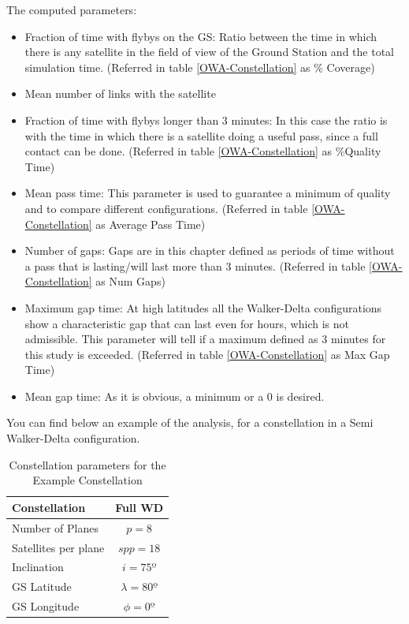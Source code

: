 The computed parameters:\label{PerfAnal}
\begin{itemize}
\item Fraction of time with flybys on the GS: Ratio between the time in which there is any satellite in the field of view of the Ground Station and the total simulation time. (Referred in table \ref{OWA-Constellation} as \% Coverage)
\item Mean number of links with the satellite
\item Fraction of time with flybys longer than 3 minutes: In this case the ratio is with the time in which there is a satellite doing a useful pass, since a full contact can be done. (Referred in table \ref{OWA-Constellation} as \%Quality Time) 
\item Mean pass time: This parameter is used to guarantee a minimum of quality and to compare different configurations. (Referred in table \ref{OWA-Constellation} as Average Pass Time)
\item Number of gaps: Gaps are in this chapter defined as periods of time without a pass that is lasting/will last more than 3 minutes. (Referred in table \ref{OWA-Constellation} as Num Gaps)
\item Maximum gap time: At high latitudes all the Walker-Delta configurations show a characteristic gap that can last even for hours, which is not admissible. This parameter will tell if a maximum defined as 3 minutes for this study is exceeded. (Referred in table \ref{OWA-Constellation} as Max Gap Time)
\item Mean gap time: As it is obvious, a minimum or a 0 is desired. 
\end{itemize}

You can find below an example of the analysis, for a constellation in a Semi Walker-Delta configuration.

\begin{table}[H]
\centering
\begin{tabular}{|l|c|}
\hline
Constellation & Full WD \\ \hline
Number of Planes     & $ p=8 $   \\ \hline
Satellites per plane   & $ spp=18 $ \\ \hline
Inclination  	 & $ i=75º $   \\ \hline
GS Latitude   & $ \lambda=80º$   \\ \hline
GS Longitude & $ \phi=0º $ \\ \hline
\end{tabular}
\caption{Constellation parameters for the Example Constellation}
\end{table}


